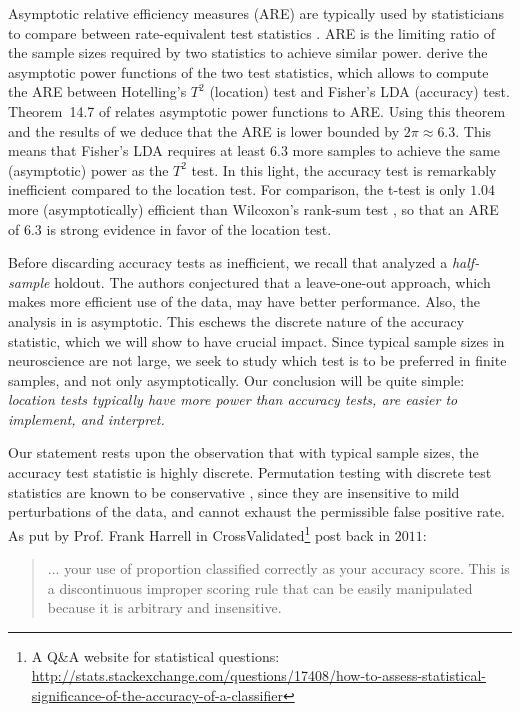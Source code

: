 \documentclass[12pt,a4paper]{article}
\begin{document}
Asymptotic relative efficiency measures (ARE) are typically used by statisticians to compare between rate-equivalent test statistics \citep{vaart_asymptotic_1998}.
ARE is the limiting ratio of the sample sizes required by two statistics to achieve similar power. 
\cite{ramdas_classification_2016} derive the asymptotic power functions of the two test statistics, which allows to compute the ARE between Hotelling's $T^2$ (location) test and Fisher's LDA (accuracy) test.
Theorem~14.7 of \cite{vaart_asymptotic_1998} relates asymptotic power functions to ARE.
Using this theorem and the results of \cite{ramdas_classification_2016} we deduce that the ARE is lower bounded by $2 \pi \approx 6.3$. 
This means that Fisher's LDA requires at least $6.3$ more samples to achieve the same (asymptotic) power as the $T^2$ test. 
In this light, the accuracy test is remarkably inefficient compared to the location test.  
For comparison, the t-test is only $1.04$ more (asymptotically) efficient than Wilcoxon's rank-sum test \citep{lehmann_parametric_2009}, so that an ARE of $6.3$ is strong evidence in favor of the location test. 

Before discarding accuracy tests as inefficient, we recall that \cite{ramdas_classification_2016} analyzed a \emph{half-sample} holdout. 
The authors conjectured that a leave-one-out approach, which makes more efficient use of the data, may have better performance. 
Also, the analysis in \cite{ramdas_classification_2016} is asymptotic. 
This eschews the discrete nature of the accuracy statistic, which we will show to have  crucial impact. 
Since typical sample sizes in neuroscience are not large, we seek to study which test is to be preferred in finite samples, and not only asymptotically.
Our conclusion will be quite simple: {\em location tests typically have more power than accuracy tests, are easier to implement, and interpret.}

Our statement rests upon the observation that with typical sample sizes, the accuracy test statistic is highly discrete. 
Permutation testing with discrete test statistics are known to be conservative \citep{hemerik_exact_2014}, since they are insensitive to mild perturbations of the data, and cannot exhaust the permissible false positive rate. 
As put by Prof. Frank Harrell in \textsf{CrossValidated\footnote{A Q\&A website for statistical questions: \url{http://stats.stackexchange.com/questions/17408/how-to-assess-statistical-significance-of-the-accuracy-of-a-classifier}}} post back in $2011$:
\begin{quote}
	... your use of proportion classified correctly as your accuracy score. This is a discontinuous improper scoring rule that can be easily manipulated because it is arbitrary and insensitive.
\end{quote}
\end{document}
